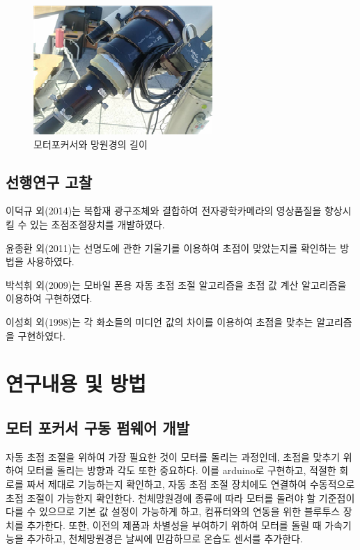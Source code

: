 \documentclass{abstract_hutech}
\begin{document}
\begin{figure}[h]
	\centering
	\includegraphics[width=1\linewidth]{telescope3}
	\caption{모터포커서와 망원경의 길이}
	\label{fig:telescope3}
\end{figure}

\subsection{선행연구 고찰}

이덕규 외(2014)는 복합재 광구조체와 결합하여 전자광학카메라의 영상품질을 향상시킬 수 있는 초점조절장치를 개발하였다.\cite{leedukgu2014}

윤종환 외(2011)는 선명도에 관한 기울기를 이용하여 초점이 맞았는지를 확인하는 방법을 사용하였다.\cite{yunjonghwan2011lcd}

박석휘 외(2009)는 모바일 폰용 자동 초점 조절 알고리즘을 초점 값 계산 알고리즘을 이용하여 구현하였다.\cite{parksukhui2009Median}

이성희 외(1998)는 각 화소들의 미디언 값의 차이를 이용하여 초점을 맞추는 알고리즘을 구현하였다.\cite{leeseonghee1998Median}

\section{연구내용 및 방법}

\subsection{모터 포커서 구동 펌웨어 개발}

자동 초점 조절을 위하여 가장 필요한 것이 모터를 돌리는 과정인데, 초점을 맞추기 위하여 모터를 돌리는 방향과 각도 또한 중요하다. 이를 arduino로 구현하고, 적절한 회로를 짜서 제대로 기능하는지 확인하고, 자동 초점 조절 장치에도 연결하여 수동적으로 초점 조절이 가능한지 확인한다. 천체망원경에 종류에 따라 모터를 돌려야 할 기준점이 다를 수 있으므로 기본 값 설정이 가능하게 하고, 컴퓨터와의 연동을 위한 블루투스 장치를 추가한다. 또한, 이전의 제품과 차별성을 부여하기 위하여 모터를 돌릴 때 가속기능을 추가하고, 천체망원경은 날씨에 민감하므로 온습도 센서를 추가한다.
\end{document}
